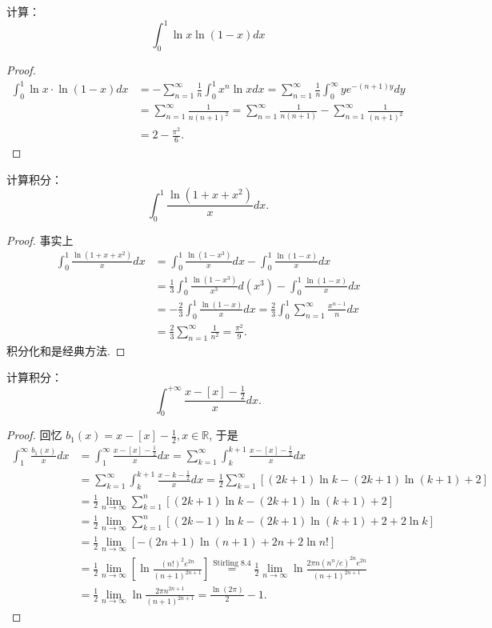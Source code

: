 \documentclass[lang=cn,10pt,thmcnt=section]{elegantbook}
\begin{document}
\begin{example}
计算：  
\[\int_{0}^{1} \ln x \ln (1 - x) dx \]
\end{example}
\begin{proof}
	\begin{align*}
		\int_0^1 \ln x \cdot \ln(1-x) dx &= -\sum_{n=1}^{\infty} \frac{1}{n} \int_0^1 x^n \ln x dx = \sum_{n=1}^{\infty} \frac{1}{n} \int_0^\infty y e^{-(n+1)y} dy \\
		&= \sum_{n=1}^{\infty} \frac{1}{n(n+1)^2} = \sum_{n=1}^{\infty} \frac{1}{n(n+1)} - \sum_{n=1}^{\infty} \frac{1}{(n+1)^2} \\
		&= 2 - \frac{\pi^2}{6}.
	\end{align*}
\end{proof}
\begin{example}
	计算积分：\[\int_{0}^{1} \frac{\ln (1 + x + x^2)}{x} dx.\]
\end{example}
\begin{proof}
	事实上
\begin{align*}
    \int_0^1 \frac{\ln(1+x+x^2)}{x} dx &= \int_0^1 \frac{\ln(1-x^3)}{x} dx - \int_0^1 \frac{\ln(1-x)}{x} dx \\
    &= \frac{1}{3} \int_0^1 \frac{\ln(1-x^3)}{x^3} d(x^3) - \int_0^1 \frac{\ln(1-x)}{x} dx \\
    &= -\frac{2}{3} \int_0^1 \frac{\ln(1-x)}{x} dx = \frac{2}{3} \int_0^1 \sum_{n=1}^{\infty} \frac{x^{n-1}}{n} dx \\
    &= \frac{2}{3} \sum_{n=1}^{\infty} \frac{1}{n^2} = \frac{\pi^2}{9}.
\end{align*}
积分化和是经典方法.
\end{proof}
\begin{example}
	计算积分：\[\int_{0}^{+\infty} \frac{x - [x] - \frac{1}{2}}{x} dx.\]
\end{example}
\begin{proof}
	回忆 $b_1(x) = x - [x] - \frac{1}{2}, x \in \mathbb{R}$, 于是
\begin{align*}
    \int_1^\infty \frac{b_1(x)}{x} dx &= \int_1^\infty \frac{x-[x]-\frac{1}{2}}{x} dx = \sum_{k=1}^\infty \int_k^{k+1} \frac{x-[x]-\frac{1}{2}}{x} dx \\
    &= \sum_{k=1}^\infty \int_k^{k+1} \frac{x-k-\frac{1}{2}}{x} dx = \frac{1}{2} \sum_{k=1}^\infty \left[ (2k+1)\ln k - (2k+1)\ln(k+1) + 2 \right] \\
    &= \frac{1}{2} \lim_{n\to\infty} \sum_{k=1}^n [(2k+1)\ln k - (2k+1)\ln(k+1) + 2] \\
    &= \frac{1}{2} \lim_{n\to\infty} \sum_{k=1}^n [(2k-1)\ln k - (2k+1)\ln(k+1) + 2 + 2\ln k] \\
    &= \frac{1}{2} \lim_{n\to\infty} [-(2n+1)\ln(n+1) + 2n + 2\ln n!] \\
    &= \frac{1}{2} \lim_{n\to\infty} \left[ \ln\frac{(n!)^2 e^{2n}}{(n+1)^{2n+1}} \right] \stackrel{\text{Stirling 8.4}}{=} \frac{1}{2} \lim_{n\to\infty} \ln\frac{2\pi n (n^n/e)^{2n} e^{2n}}{(n+1)^{2n+1}} \\
    &= \frac{1}{2} \lim_{n\to\infty} \ln\frac{2\pi n^{2n+1}}{(n+1)^{2n+1}} = \frac{\ln(2\pi)}{2} - 1.
\end{align*}

\end{proof}
\end{document}

